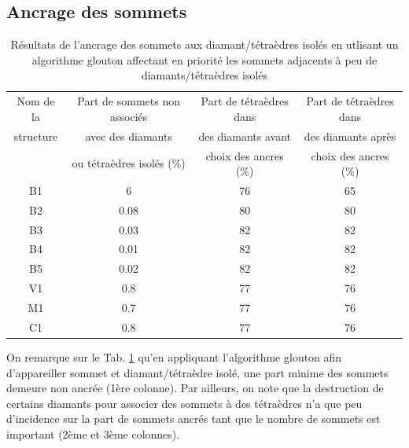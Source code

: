 \subsection{Ancrage des sommets}
\begin{table}[H]
\footnotesize
\centering
\begin{tabular}{|c | c | c | c |}
\hline
Nom de la & Part de sommets non associés & Part de tétraèdres dans  & Part de tétraèdres dans \\
structure&avec des diamants  & des diamants avant & des diamants après \\
& ou tétraèdres isolés (\%) & choix des ancres (\%)& choix des ancres (\%)\\
\hline
B1 & 6 & 76& 65 \\
B2 & 0.08& 80 & 80 \\
B3 & 0.03& 82 & 82\\
B4 & 0.01 & 82 & 82\\
B5 & 0.02 & 82 & 82\\
V1 & 0.8  & 77 & 76 \\
M1 & 0.7 & 77& 76\\
C1 & 0.8 & 77 & 76 \\
\hline  
\end{tabular}
\caption{Résultats de l'ancrage des sommets aux diamant/tétraèdres isolés en utlisant un algorithme glouton affectant en priorité les sommets adjacents à peu de diamants/tétraèdres isolés}
\label{tab:results_ancres}
\end{table}
\noindent
On remarque sur le Tab. \ref{tab:results_ancres} qu'en appliquant l'algorithme glouton afin d'appareiller sommet et diamant/tétraèdre isolé, une part minime des sommets demeure non ancrée (1ère colonne). Par ailleurs, on note que la destruction de certains diamants pour associer des sommets à des tétraèdres n'a que peu d'incidence sur la part de sommets ancrés tant que le nombre de sommets est important (2ème et 3ème colonnes).

